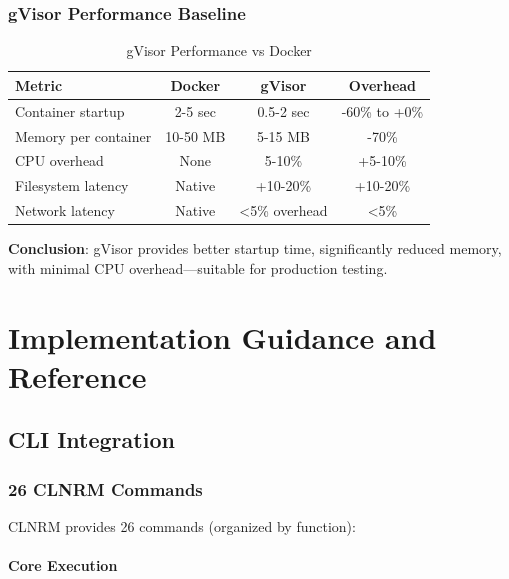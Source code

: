\documentclass[12pt,twoside,openright]{book}
\theoremstyle{plain}
\theoremstyle{definition}
\theoremstyle{remark}
\begin{document}
\section{gVisor Performance Baseline}

\begin{table}[H]
\centering
\begin{tabular}{|l|c|c|c|}
\hline
\textbf{Metric} & \textbf{Docker} & \textbf{gVisor} & \textbf{Overhead} \\
\hline
Container startup & 2-5 sec & 0.5-2 sec & -60\% to +0\% \\
\hline
Memory per container & 10-50 MB & 5-15 MB & -70\% \\
\hline
CPU overhead & None & 5-10\% & +5-10\% \\
\hline
Filesystem latency & Native & +10-20\% & +10-20\% \\
\hline
Network latency & Native & <5\% overhead & <5\% \\
\hline
\end{tabular}
\caption{gVisor Performance vs Docker}
\label{tab:perf_baseline}
\end{table}

\textbf{Conclusion}: gVisor provides better startup time, significantly reduced memory, with minimal CPU overhead—suitable for production testing.


\part{Implementation Guidance and Reference}

\chapter{CLI Integration}

\section{26 CLNRM Commands}

CLNRM provides 26 commands (organized by function):

\subsection{Core Execution}
\end{document}
